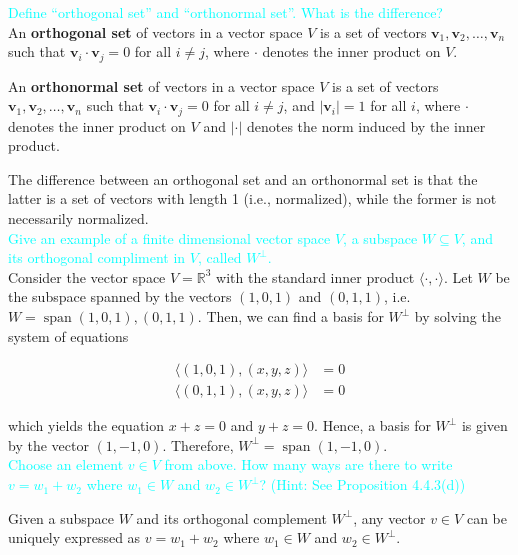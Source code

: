 \documentclass[fontsize=12pt]{scrartcl}
\begin{document}
\bigskip

\textcolor{cyan}{Define ``orthogonal set'' and ``orthonormal set''. What is the difference?}\\

\noindent
An \textbf{orthogonal set} of vectors in a vector space $V$ is a set of vectors ${\mathbf{v}_1, \mathbf{v}_2, \ldots, \mathbf{v}_n}$ such that $\mathbf{v}_i \cdot \mathbf{v}_j = 0$ for all $i \neq j$, where $\cdot$ denotes the inner product on $V$.

\noindent
An \textbf{orthonormal set} of vectors in a vector space $V$ is a set of vectors ${\mathbf{v}_1, \mathbf{v}_2, \ldots, \mathbf{v}_n}$ such that $\mathbf{v}_i \cdot \mathbf{v}_j = 0$ for all $i \neq j$, and $|\mathbf{v}_i| = 1$ for all $i$, where $\cdot$ denotes the inner product on $V$ and $|\cdot|$ denotes the norm induced by the inner product.

\noindent
The difference between an orthogonal set and an orthonormal set is that the latter is a set of vectors with length 1 (i.e., normalized), while the former is not necessarily normalized.
\\

\noindent
\textcolor{cyan}{Give an example of a finite dimensional vector space $V$, a subspace $W \subseteq V$, and its orthogonal compliment in $V$, called $W^{\perp}$.}\\

\noindent
Consider the vector space $V = \mathbb{R}^3$ with the standard inner product $\langle \cdot, \cdot \rangle$. Let $W$ be the subspace spanned by the vectors $(1,0,1)$ and $(0,1,1)$, i.e. $W = \operatorname{span} {(1,0,1),(0,1,1)}$. Then, we can find a basis for $W^{\perp}$ by solving the system of equations

\begin{align*}
\langle (1,0,1), (x,y,z) \rangle &= 0 \\
\langle (0,1,1), (x,y,z) \rangle &= 0
\end{align*}

\noindent
which yields the equation $x+z = 0$ and $y+z=0$. Hence, a basis for $W^{\perp}$ is given by the vector $(1,-1,0)$. Therefore, $W^{\perp} = \operatorname{span} {(1,-1,0)}$.
\\

\noindent
\textcolor{cyan}{Choose an element $v \in V$ from above. How many ways are there to write $v = w_1 + w_2$ where $w_1 \in W$ and $w_2 \in W^{\perp}$? (Hint: See Proposition 4.4.3(d))}

\noindent
Given a subspace $W$ and its orthogonal complement $W^{\perp}$, any vector $v \in V$ can be uniquely expressed as $v = w_1 + w_2$ where $w_1 \in W$ and $w_2 \in W^{\perp}$.
\end{document}
